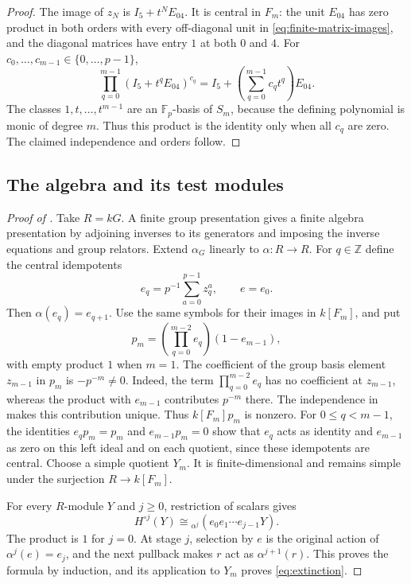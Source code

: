 \documentclass[11pt]{article}
\numberwithin{equation}{section}
\theoremstyle{definition}
\theoremstyle{remark}
\newcommand{\F}{\mathbb F}
\newcommand{\Z}{\mathbb Z}
\begin{document}
\begin{proof}
The image of $z_N$ is $I_5+t^NE_{04}$.  It is central in $F_m$:
the unit $E_{04}$ has zero product in both orders with every
off-diagonal unit in \eqref{eq:finite-matrix-images}, and the
diagonal matrices have entry $1$ at both $0$ and $4$.  For
$c_0,\ldots,c_{m-1}\in\{0,\ldots,p-1\}$,
\[
 \prod_{q=0}^{m-1}(I_5+t^qE_{04})^{c_q}
   =I_5+\left(\sum_{q=0}^{m-1}c_qt^q\right)E_{04}.
\]
The classes $1,t,\ldots,t^{m-1}$ are an $\F_p$-basis of $S_m$,
because the defining polynomial is monic of degree $m$.
Thus this product is the identity only when all $c_q$ are zero.
The claimed independence and orders follow.
\end{proof}

\subsection{The algebra and its test modules}

\begin{proof}[Proof of ]
Take $R=kG$. A finite group presentation gives a finite algebra
presentation by adjoining inverses to its generators and imposing
the inverse equations and group relators. Extend $\alpha_G$ linearly
to $\alpha:R\to R$. For $q\in\Z$ define the central idempotents
\[
e_q=p^{-1}\sum_{a=0}^{p-1}z_q^a,\qquad e=e_0.
\]
Then $\alpha(e_q)=e_{q+1}$.
Use the same symbols for their images in $k[F_m]$, and put
\[
p_m=\left(\prod_{q=0}^{m-2}e_q\right)(1-e_{m-1}),
\]
with empty product $1$ when $m=1$.
The coefficient of the group basis element $z_{m-1}$ in $p_m$ is
$-p^{-m}\ne0$.
Indeed, the term $\prod_{q=0}^{m-2}e_q$ has no coefficient at
$z_{m-1}$, whereas the product with $e_{m-1}$ contributes $p^{-m}$
there. The independence in  makes
this contribution unique. Thus $k[F_m]p_m$ is nonzero.
For $0\le q<m-1$, the identities $e_qp_m=p_m$ and $e_{m-1}p_m=0$
show that $e_q$ acts as identity and $e_{m-1}$ as zero on this left
ideal and on each quotient, since these idempotents are central.
Choose a simple quotient $Y_m$. It is finite-dimensional and remains
simple under the surjection $R\to k[F_m]$.

For every $R$-module $Y$ and $j\ge0$, restriction of scalars gives
\begin{equation}\label{eq:selection-iterates}
H^{\circ j}(Y)\cong{}_{\alpha^j}(e_0e_1\cdots e_{j-1}Y).
\end{equation}
The product is $1$ for $j=0$. At stage $j$, selection by $e$ is the original action of
$\alpha^j(e)=e_j$, and the next pullback makes $r$ act as
$\alpha^{j+1}(r)$. This proves the formula by induction, and its
application to $Y_m$ proves \eqref{eq:extinction}.
\end{proof}
\end{document}

